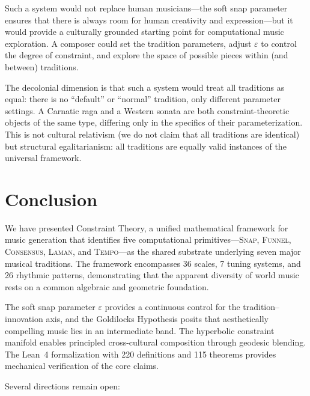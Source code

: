 \documentclass[cmj]{article}
\newcommand{\eps}{\varepsilon}
\newcommand{\SNAP}{\textsc{Snap}}
\newcommand{\FUNNEL}{\textsc{Funnel}}
\newcommand{\CONSENSUS}{\textsc{Consensus}}
\newcommand{\LAMAN}{\textsc{Laman}}
\newcommand{\TEMPO}{\textsc{Tempo}}
\begin{document}
Such a system would not replace human musicians---the soft snap parameter
ensures that there is always room for human creativity and expression---but it
would provide a culturally grounded starting point for computational music
exploration. A composer could set the tradition parameters, adjust $\eps$ to
control the degree of constraint, and explore the space of possible pieces
within (and between) traditions.

The decolonial dimension is that such a system would treat all traditions as
equal: there is no ``default'' or ``normal'' tradition, only different
parameter settings. A Carnatic raga and a Western sonata are both
constraint-theoretic objects of the same type, differing only in the specifics
of their parameterization. This is not cultural relativism (we do not claim
that all traditions are identical) but structural egalitarianism: all
traditions are equally valid instances of the universal framework.

\section{Conclusion}
\label{sec:conclusion}

We have presented Constraint Theory, a unified mathematical framework for
music generation that identifies five computational primitives---\SNAP{},
\FUNNEL{}, \CONSENSUS{}, \LAMAN{}, and \TEMPO{}---as the shared substrate
underlying seven major musical traditions. The framework encompasses 36
scales, 7 tuning systems, and 26 rhythmic patterns, demonstrating that the
apparent diversity of world music rests on a common algebraic and geometric
foundation.

The soft snap parameter $\eps$ provides a continuous control for the
tradition--innovation axis, and the Goldilocks Hypothesis posits that
aesthetically compelling music lies in an intermediate band. The hyperbolic
constraint manifold enables principled cross-cultural composition through
geodesic blending. The Lean~4 formalization with 220 definitions and 115
theorems provides mechanical verification of the core claims.

Several directions remain open:
\end{document}
